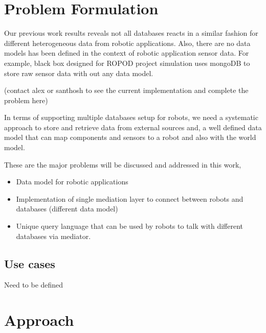 \documentclass[12pt]{article}
\begin{document}
 

\section{Problem Formulation}

Our previous work results reveals not all databases reacts in a similar fashion for different heterogeneous data from robotic applications. Also, there are no data models has been defined in the context of robotic application sensor data. For example, black box designed for ROPOD project simulation uses mongoDB to store raw sensor data with out any data model. 

(contact alex or santhosh to see the current implementation and complete the problem here)

In terms of supporting multiple databases setup for robots,  we need a systematic approach to store and retrieve data from external sources and, a well defined data model that can map components and sensors to a robot and also with the world model.

These are the major problems will be discussed and addressed in this work,
\begin{itemize}
	\item Data model for robotic applications
	\item Implementation of single mediation layer to connect between robots and databases (different data model)
	\item Unique query language that can be used by robots to talk with different databases via mediator.
\end{itemize}



\subsection{Use cases}
Need to be defined

\section{Approach}
\end{document}
